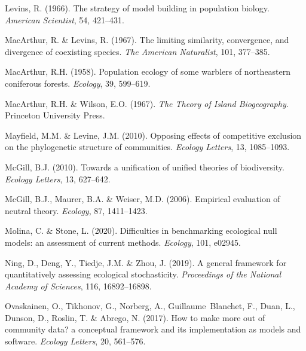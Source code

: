 \begin{thebibliography}{70}
	Levins, R. (1966).
	\newblock The strategy of model building in population biology.
	\newblock \emph{American Scientist}, 54, 421--431.
	
	MacArthur, R. \& Levins, R. (1967).
	\newblock The limiting similarity, convergence, and divergence of coexisting
	species.
	\newblock \emph{The American Naturalist}, 101, 377--385.
	
	MacArthur, R.H. (1958).
	\newblock Population ecology of some warblers of northeastern coniferous
	forests.
	\newblock \emph{Ecology}, 39, 599--619.
	
	MacArthur, R.H. \& Wilson, E.O. (1967).
	\newblock \emph{The Theory of Island Biogeography}.
	\newblock Princeton University Press.
	
	Mayfield, M.M. \& Levine, J.M. (2010).
	\newblock Opposing effects of competitive exclusion on the phylogenetic
	structure of communities.
	\newblock \emph{Ecology Letters}, 13, 1085--1093.
	
	McGill, B.J. (2010).
	\newblock Towards a unification of unified theories of biodiversity.
	\newblock \emph{Ecology Letters}, 13, 627--642.
	
	McGill, B.J., Maurer, B.A. \& Weiser, M.D. (2006).
	\newblock Empirical evaluation of neutral theory.
	\newblock \emph{Ecology}, 87, 1411--1423.
	
	Molina, C. \& Stone, L. (2020).
	\newblock Difficulties in benchmarking ecological null models: an assessment of
	current methods.
	\newblock \emph{Ecology}, 101, e02945.
	
	Ning, D., Deng, Y., Tiedje, J.M. \& Zhou, J. (2019).
	\newblock A general framework for quantitatively assessing ecological
	stochasticity.
	\newblock \emph{Proceedings of the National Academy of Sciences}, 116,
	16892--16898.
	
	Ovaskainen, O., Tikhonov, G., Norberg, A., Guillaume~Blanchet, F., Duan, L.,
	Dunson, D., Roslin, T. \& Abrego, N. (2017).
	\newblock How to make more out of community data? a conceptual framework and
	its implementation as models and software.
	\newblock \emph{Ecology Letters}, 20, 561--576.
	

\end{thebibliography}
